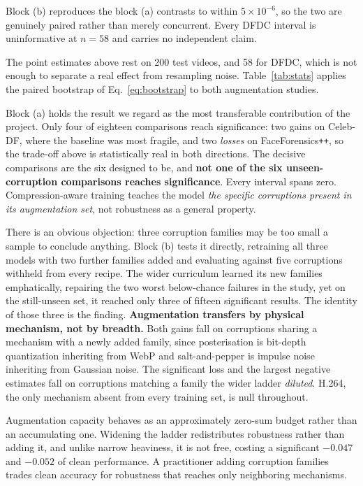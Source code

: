 \documentclass[journal,onecolumn]{IEEEtran}
\newcommand{\celebdf}{Celeb-DF}
\newcommand{\dfdc}{DFDC}
\begin{document}
\begin{table}[!ht]
\vspace{0.5ex}
\begin{minipage}{0.95\textwidth}
\footnotesize
Block (b) reproduces the block (a) contrasts to within $5\times10^{-6}$, so the
two are genuinely paired rather than merely concurrent. Every \dfdc{} interval is
uninformative at $n = 58$ and carries no independent claim.
\end{minipage}
\end{table}

The point estimates above rest on 200 test videos, and 58 for \dfdc{}, which is
not enough to separate a real effect from resampling noise.
Table~\ref{tab:stats} applies the paired bootstrap of Eq.~\eqref{eq:bootstrap} to
both augmentation studies.

Block (a) holds the result we regard as the most transferable contribution of the
project. Only four of eighteen comparisons reach significance: two gains on
\celebdf{}, where the baseline was most fragile, and two \emph{losses} on
FaceForensics\texttt{++}, so the trade-off above is statistically real in both
directions. The decisive comparisons are the six designed to be, and
\textbf{not one of the six unseen-corruption comparisons reaches significance}.
Every interval spans zero. Compression-aware training teaches the model \emph{the
specific corruptions present in its augmentation set}, not robustness as a
general property.

There is an obvious objection: three corruption families may be too small a
sample to conclude anything. Block (b) tests it directly, retraining all
three models with two further families added and evaluating against five
corruptions withheld from every recipe. The wider curriculum learned its new
families emphatically, repairing the two worst below-chance failures in the
study, yet on the still-unseen set, it reached only three of fifteen significant
results. The identity of those three is the finding.
\textbf{Augmentation transfers by physical mechanism, not by breadth.} Both gains
fall on corruptions sharing a mechanism with a newly added family, since
posterisation is bit-depth quantization inheriting from WebP and salt-and-pepper
is impulse noise inheriting from Gaussian noise. The significant loss and the
largest negative estimates fall on corruptions matching a family the wider
ladder \emph{diluted}. H.264, the only mechanism absent from every training set, is null
throughout.

Augmentation capacity behaves as an approximately zero-sum budget rather than an
accumulating one. Widening the ladder redistributes robustness rather than adding
it, and unlike narrow heaviness, it is not free, costing a significant $-0.047$
and $-0.052$ of clean performance. A practitioner adding corruption families
trades clean accuracy for robustness that reaches only neighboring mechanisms.
\end{document}
